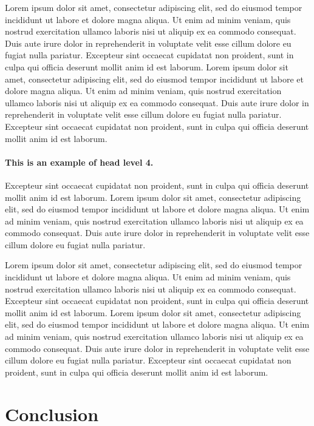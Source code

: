 \documentclass[english]{sbc2025}%
\begin{document}
Lorem ipsum dolor sit amet, consectetur adipiscing elit, sed do eiusmod tempor incididunt ut labore et dolore magna aliqua. Ut enim ad minim veniam, quis nostrud exercitation ullamco laboris nisi ut aliquip ex ea commodo consequat. Duis aute irure dolor in reprehenderit in voluptate velit esse cillum dolore eu fugiat nulla pariatur. Excepteur sint occaecat cupidatat non proident, sunt in culpa qui officia deserunt mollit anim id est laborum. Lorem ipsum dolor sit amet, consectetur adipiscing elit, sed do eiusmod tempor incididunt ut labore et dolore magna aliqua. Ut enim ad minim veniam, quis nostrud exercitation ullamco laboris nisi ut aliquip ex ea commodo consequat. Duis aute irure dolor in reprehenderit in voluptate velit esse cillum dolore eu fugiat nulla pariatur. Excepteur sint occaecat cupidatat non proident, sunt in culpa qui officia deserunt mollit anim id est laborum.



\paragraph{This is an example of head level 4.}

Excepteur sint occaecat cupidatat non proident, sunt in culpa qui officia deserunt mollit anim id est laborum. Lorem ipsum dolor sit amet, consectetur adipiscing elit, sed do eiusmod tempor incididunt ut labore et dolore magna aliqua. Ut enim ad minim veniam, quis nostrud exercitation ullamco laboris nisi ut aliquip ex ea commodo consequat. Duis aute irure dolor in reprehenderit in voluptate velit esse cillum dolore eu fugiat nulla pariatur. 

Lorem ipsum dolor sit amet, consectetur adipiscing elit, sed do eiusmod tempor incididunt ut labore et dolore magna aliqua. Ut enim ad minim veniam, quis nostrud exercitation ullamco laboris nisi ut aliquip ex ea commodo consequat. Excepteur sint occaecat cupidatat non proident, sunt in culpa qui officia deserunt mollit anim id est laborum. Lorem ipsum dolor sit amet, consectetur adipiscing elit, sed do eiusmod tempor incididunt ut labore et dolore magna aliqua. Ut enim ad minim veniam, quis nostrud exercitation ullamco laboris nisi ut aliquip ex ea commodo consequat. Duis aute irure dolor in reprehenderit in voluptate velit esse cillum dolore eu fugiat nulla pariatur. Excepteur sint occaecat cupidatat non proident, sunt in culpa qui officia deserunt mollit anim id est laborum.

\section{Conclusion}
\end{document}
